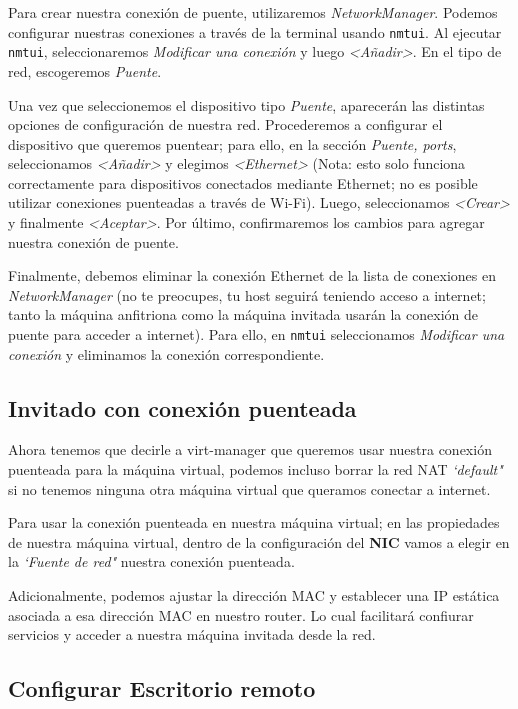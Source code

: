 \documentclass[11pt]{article}
\begin{document}
Para crear nuestra conexión de puente, utilizaremos \emph{NetworkManager}. Podemos configurar nuestras conexiones a través de la terminal usando \texttt{nmtui}. Al ejecutar \texttt{nmtui}, seleccionaremos \emph{Modificar una conexión} y luego \emph{<Añadir>}. En el tipo de red, escogeremos \emph{Puente}.

Una vez que seleccionemos el dispositivo tipo \emph{Puente}, aparecerán las distintas opciones de configuración de nuestra red. Procederemos a configurar el dispositivo que queremos puentear; para ello, en la sección \emph{Puente, ports}, seleccionamos \emph{<Añadir>} y elegimos \emph{<Ethernet>} (Nota: esto solo funciona correctamente para dispositivos conectados mediante Ethernet; no es posible utilizar conexiones puenteadas a través de Wi-Fi). Luego, seleccionamos \emph{<Crear>} y finalmente \emph{<Aceptar>}. Por último, confirmaremos los cambios para agregar nuestra conexión de puente.

Finalmente, debemos eliminar la conexión Ethernet de la lista de conexiones en \emph{NetworkManager} (no te preocupes, tu host seguirá teniendo acceso a internet; tanto la máquina anfitriona como la máquina invitada usarán la conexión de puente para acceder a internet). Para ello, en \texttt{nmtui} seleccionamos \emph{Modificar una conexión} y eliminamos la conexión correspondiente.

\subsection{Invitado con conexión puenteada}

Ahora tenemos que decirle a virt-manager que queremos usar nuestra conexión puenteada para la máquina virtual, podemos incluso borrar la red NAT \emph{`default"} si no tenemos ninguna otra máquina virtual que queramos conectar a internet.

Para usar la conexión puenteada en nuestra máquina virtual; en las propiedades de nuestra máquina virtual, dentro de la configuración del \textbf{NIC} vamos a elegir en la \emph{`Fuente de red"} nuestra conexión puenteada.

Adicionalmente, podemos ajustar la dirección MAC y establecer una IP estática asociada a esa dirección MAC en nuestro router. Lo cual facilitará confiurar servicios y acceder a nuestra máquina invitada desde la red.

\subsection{Configurar Escritorio remoto}
\end{document}
